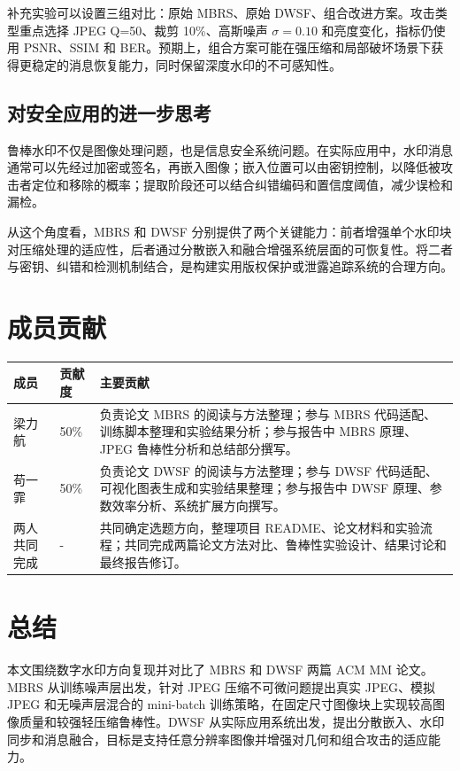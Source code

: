 ﻿\documentclass[UTF8,zihao=5]{ctexart}
\begin{document}
补充实验可以设置三组对比：原始 MBRS、原始 DWSF、组合改进方案。攻击类型重点选择 JPEG Q=50、裁剪 10\%、高斯噪声 \(\sigma=0.10\) 和亮度变化，指标仍使用 PSNR、SSIM 和 BER。预期上，组合方案可能在强压缩和局部破坏场景下获得更稳定的消息恢复能力，同时保留深度水印的不可感知性。

\subsection{对安全应用的进一步思考}

鲁棒水印不仅是图像处理问题，也是信息安全系统问题。在实际应用中，水印消息通常可以先经过加密或签名，再嵌入图像；嵌入位置可以由密钥控制，以降低被攻击者定位和移除的概率；提取阶段还可以结合纠错编码和置信度阈值，减少误检和漏检。

从这个角度看，MBRS 和 DWSF 分别提供了两个关键能力：前者增强单个水印块对压缩处理的适应性，后者通过分散嵌入和融合增强系统层面的可恢复性。将二者与密钥、纠错和检测机制结合，是构建实用版权保护或泄露追踪系统的合理方向。


\section{成员贡献}

\begin{table}[H]
\centering
\footnotesize
\setlength{\tabcolsep}{4pt}
\begin{tabular}{p{}p{}p{}}
\toprule
成员 & 贡献度 & 主要贡献 \\
\midrule
梁力航 & 50\% & 负责论文 MBRS 的阅读与方法整理；参与 MBRS 代码适配、训练脚本整理和实验结果分析；参与报告中 MBRS 原理、JPEG 鲁棒性分析和总结部分撰写。 \\
苟一霏 & 50\% & 负责论文 DWSF 的阅读与方法整理；参与 DWSF 代码适配、可视化图表生成和实验结果整理；参与报告中 DWSF 原理、参数效率分析、系统扩展方向撰写。 \\
两人共同完成 & - & 共同确定选题方向，整理项目 README、论文材料和实验流程；共同完成两篇论文方法对比、鲁棒性实验设计、结果讨论和最终报告修订。 \\
\bottomrule
\end{tabular}
\end{table}


\section{总结}

本文围绕数字水印方向复现并对比了 MBRS 和 DWSF 两篇 ACM MM 论文。MBRS 从训练噪声层出发，针对 JPEG 压缩不可微问题提出真实 JPEG、模拟 JPEG 和无噪声层混合的 mini-batch 训练策略，在固定尺寸图像块上实现较高图像质量和较强轻压缩鲁棒性。DWSF 从实际应用系统出发，提出分散嵌入、水印同步和消息融合，目标是支持任意分辨率图像并增强对几何和组合攻击的适应能力。
\end{document}
